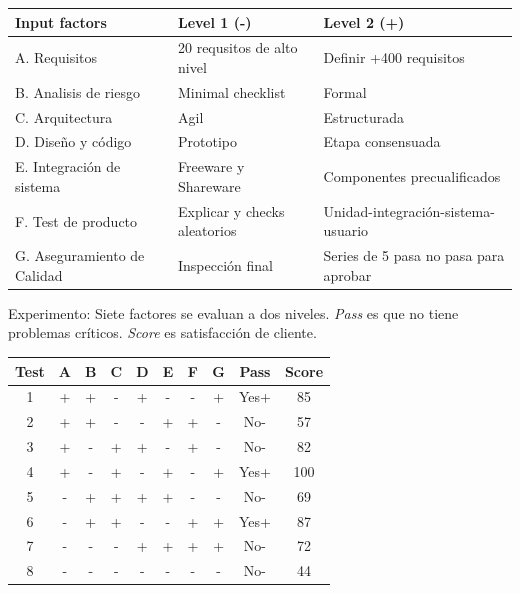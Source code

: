 \documentclass[]{article}
\begin{document}
\begin{table}[H]
	\begin{center}
\begin{tabular}{|p{5cm}|p{5cm}|p{5cm}|}
	\hline Input factors & Level 1 (-) & Level 2 (+) \\
	\hline A. Requisitos & 20 requsitos de alto nivel & Definir +400 requisitos \\
	\hline B. Analisis de riesgo & Minimal checklist & Formal \\
	\hline C. Arquitectura & Agil & Estructurada \\
	\hline D. Diseño y código & Prototipo & Etapa consensuada \\
	\hline E. Integración de sistema & Freeware y Shareware & Componentes precualificados \\
	\hline F. Test de producto & Explicar y checks aleatorios & Unidad-integración-sistema-usuario \\
	\hline G. Aseguramiento de Calidad & Inspección final & Series de 5 pasa no pasa para aprobar \\
	\hline
\end{tabular}
\end{center}
\end{table}
Experimento: Siete factores se evaluan a dos niveles. \textit{Pass} es que no tiene problemas críticos. \textit{Score} es satisfacción de cliente.

\begin{table}[H]
	\begin{center}
\begin{tabular}{|c|c|c|c|c|c|c|c|c|c|}
	\hline Test & A & B & C & D & E & F & G & Pass & Score \\
	\hline 1 & + & + & - & + & - & - & + & Yes+& 85 \\
	\hline 2 & + & + & - & - & + & + & - & No- & 57 \\
	\hline 3 & + & - & + & + & - & + & - & No- & 82 \\
	\hline 4 & + & - & + & - & + & - & + & Yes+& 100 \\
	\hline 5 & - & + & + & + & + & - & - & No- & 69 \\
	\hline 6 & - & + & + & - & - & + & + & Yes+& 87 \\
	\hline 7 & - & - & - & + & + & + & + & No- & 72 \\
	\hline 8 & - & - & - & - & - & - & - & No- & 44 \\
	\hline
\end{tabular}
\end{center}
\end{table}
\end{document}
